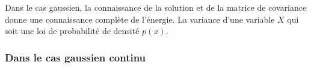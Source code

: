 \documentclass[../main/These_Mathias_Paget.tex]{subfiles}
\begin{document}


Dans le cas gaussien, la connaissance de la solution et de la matrice de covariance donne une connaissance complète de l’énergie. La variance d'une variable $X$ qui soit une loi de probabilité de densité $p(x)$.

\subsubsection{Dans le cas gaussien continu}
\end{document}
